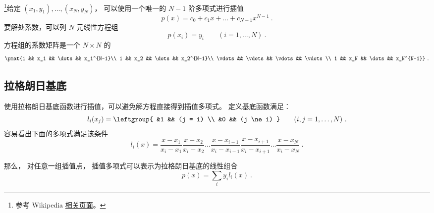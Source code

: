 

\footnote{参考 Wikipedia \href{https://en.wikipedia.org/wiki/Lagrange_polynomial}{相关页面}。}给定 $(x_1, y_1), \dots, (x_N, y_N)$， 可以使用一个唯一的 $N-1$ 阶多项式进行插值
\begin{equation}
p(x) = c_0 + c_1x + \dots + c_{N-1}x^{N-1}~.
\end{equation}
要解处系数，可以列 $N$ 元线性方程组
\begin{equation}
p(x_i) = y_i \qquad (i=1,\dots,N)~.
\end{equation}
方程组的系数矩阵是一个 $N\times N$ 的
\begin{equation}
\pmat{1 && x_1 && \dots && x_1^{N-1}\\
1 && x_2 && \dots && x_2^{N-1}\\
\vdots && \vdots && \vdots && \vdots \\
1 && x_N && \dots && x_N^{N-1}}~.
\end{equation}

\subsection{拉格朗日基底}
使用拉格朗日基底函数进行插值，可以避免解方程直接得到插值多项式。 定义基底函数满足：
\begin{equation}
l_i(x_j) = \leftgroup{
&1 && (j = i) \\
&0 && (j \ne i)
} \qquad (i,j=1,\dots,N)~.
\end{equation}
容易看出下面的多项式满足该条件
\begin{equation}
l_i(x) = \frac{x-x_1}{x_i-x_1} \frac{x-x_2}{x_i-x_2}  \dots \frac{x-x_{i-1}}{x_i-x_{i-1}}\frac{x-x_{i+1}}{x_i-x_{i+1}} \dots \frac{x-x_N}{x_i-x_N}~.
\end{equation}

那么， 对任意一组插值点， 插值多项式可以表示为拉格朗日基底的线性组合
\begin{equation}
p(x) = \sum_i y_i l_i(x)~.
\end{equation}
